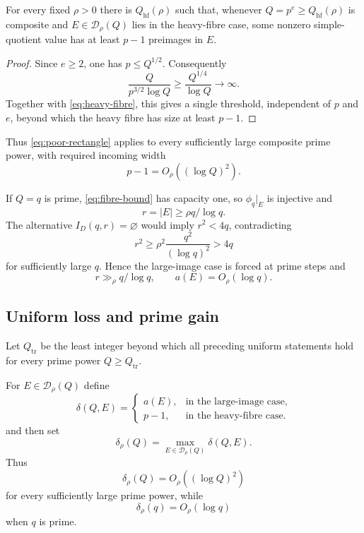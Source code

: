 \begin{lemma}\label{lem:uniform-heavy-fibre}
For every fixed $\rho>0$ there is $Q_{\mathrm{hf}}(\rho)$ such that, whenever $Q=p^e\ge Q_{\mathrm{hf}}(\rho)$ is composite and $E\in\mathcal D_\rho(Q)$ lies in the heavy-fibre case, some nonzero simple-quotient value has at least $p-1$ preimages in $E$.
\end{lemma}

\begin{proof}
Since $e\ge2$, one has $p\le Q^{1/2}$.  Consequently
\[
\frac{Q}{p^{3/2}\log Q}
\ge\frac{Q^{1/4}}{\log Q}
\longrightarrow\infty.
\]
Together with \eqref{eq:heavy-fibre}, this gives a single threshold, independent of $p$ and $e$, beyond which the heavy fibre has size at least $p-1$.
\end{proof}

Thus \eqref{eq:poor-rectangle} applies to every sufficiently large composite prime power, with required incoming width
\[
p-1=O_\rho((\log Q)^2).
\]

If $Q=q$ is prime, \eqref{eq:fibre-bound} has capacity one, so $\phi_q|_E$ is injective and
\[
r=|E|\ge \rho q/\log q.
\]
The alternative $I_D(q,r)=\varnothing$ would imply $r^2<4q$, contradicting
\[
r^2\ge \rho^2\frac{q^2}{(\log q)^2}>4q
\]
for sufficiently large $q$.  Hence the large-image case is forced at prime steps and
\begin{equation}\label{eq:prime-rich}
r\gg_\rho q/\log q,
\qquad
a(E)=O_\rho(\log q).
\end{equation}

\subsection{Uniform loss and prime gain}

Let $Q_{\mathrm{tr}}$ be the least integer beyond which all preceding uniform statements hold for every prime power $Q\ge Q_{\mathrm{tr}}$.

For $E\in\mathcal D_\rho(Q)$ define
\[
\delta(Q,E)=
\begin{cases}
a(E),&\text{in the large-image case},\\
p-1,&\text{in the heavy-fibre case}.
\end{cases}
\]
and then set
\begin{equation}\label{eq:common-demand}
\delta_\rho(Q)=
\max_{E\in\mathcal D_\rho(Q)}\delta(Q,E).
\end{equation}
Thus
\begin{equation}\label{eq:d-composite}
\delta_\rho(Q)=O_\rho((\log Q)^2)
\end{equation}
for every sufficiently large prime power, while
\begin{equation}\label{eq:d-prime}
\delta_\rho(q)=O_\rho(\log q)
\end{equation}
when $q$ is prime.

